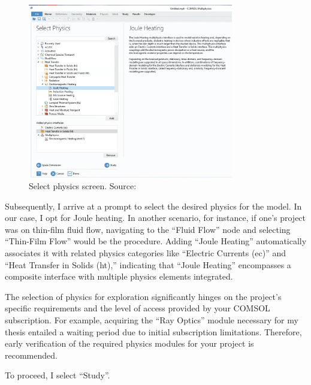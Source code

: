 \begin{figure}[H]
  \centering
  \includegraphics[width=0.8\textwidth]{Chapters/Figures/Chapter 3 Figures/Select Physics.png}
  \caption{Select physics screen. Source: \cite{multiphysics__modeling_nodate}}
  \label{fig:Select Physics}
\end{figure}

Subsequently, I arrive at a prompt to select the desired physics for the model. In our case, I opt for Joule heating. In another scenario, for instance, if one's project was on thin-film fluid flow, navigating to the ``Fluid Flow'' node and selecting ``Thin-Film Flow'' would be the procedure. Adding ``Joule Heating'' automatically associates it with related physics categories like ``Electric Currents (ec)'' and ``Heat Transfer in Solids (ht),'' indicating that ``Joule Heating'' encompasses a composite interface with multiple physics elements integrated.

The selection of physics for exploration significantly hinges on the project's specific requirements and the level of access provided by your COMSOL subscription. For example, acquiring the ``Ray Optics'' module necessary for my thesis entailed a waiting period due to initial subscription limitations. Therefore, early verification of the required physics modules for your project is recommended.

To proceed, I select ``Study''.

